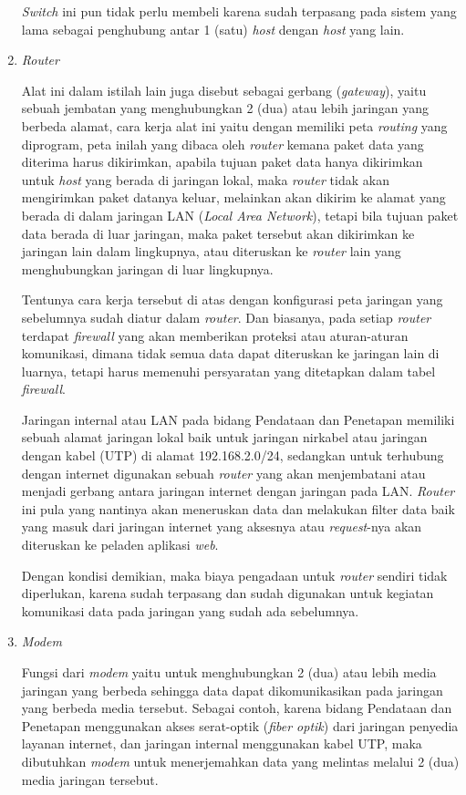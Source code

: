 \documentclass[pdftex,12pt, oneside]{article}
\begin{document}
\begin{enumerate}
\textit{Switch} ini pun tidak perlu membeli karena sudah terpasang pada sistem yang lama sebagai penghubung antar 1 (satu) \textit{host} dengan \textit{host} yang lain.

	\item \textit{Router}

Alat ini dalam istilah lain juga disebut sebagai gerbang (\textit{gateway}), yaitu sebuah jembatan yang menghubungkan 2 (dua) atau lebih jaringan yang berbeda alamat, cara kerja alat ini yaitu dengan memiliki peta \textit{routing} yang diprogram, peta inilah yang dibaca oleh \textit{router} kemana paket data yang diterima harus dikirimkan, apabila tujuan paket data hanya dikirimkan untuk \textit{host} yang berada di jaringan lokal, maka \textit{router} tidak akan mengirimkan paket datanya keluar, melainkan akan dikirim ke alamat yang berada di dalam jaringan LAN (\textit{Local Area Network}), tetapi bila tujuan paket data berada di luar jaringan, maka paket tersebut akan dikirimkan ke jaringan lain dalam lingkupnya, atau diteruskan ke \textit{router} lain yang menghubungkan jaringan di luar lingkupnya.
	
	Tentunya cara kerja tersebut di atas dengan konfigurasi peta jaringan yang sebelumnya sudah diatur dalam \textit{router}. Dan biasanya, pada setiap \textit{router} terdapat \textit{firewall} yang akan memberikan proteksi atau aturan-aturan komunikasi, dimana tidak semua data dapat diteruskan ke jaringan lain di luarnya, tetapi harus memenuhi persyaratan yang ditetapkan dalam tabel \textit{firewall}.
	
	Jaringan internal atau LAN pada bidang Pendataan dan Penetapan memiliki sebuah alamat jaringan lokal baik untuk jaringan nirkabel atau jaringan dengan kabel (UTP) di alamat 192.168.2.0/24, sedangkan untuk terhubung dengan internet digunakan sebuah \textit{router} yang akan menjembatani atau menjadi gerbang antara jaringan internet dengan jaringan pada LAN. \textit{Router} ini pula yang nantinya akan meneruskan data dan melakukan filter data baik yang masuk dari jaringan internet yang aksesnya atau \textit{request}-nya akan diteruskan ke peladen aplikasi \textit{web}.

Dengan kondisi demikian, maka biaya pengadaan untuk \textit{router} sendiri tidak diperlukan, karena sudah terpasang dan sudah digunakan untuk kegiatan komunikasi data pada jaringan yang sudah ada sebelumnya.

	\item \textit{Modem}
	
Fungsi dari \textit{modem} yaitu untuk menghubungkan 2 (dua) atau lebih media jaringan yang berbeda sehingga data dapat dikomunikasikan pada jaringan yang berbeda media tersebut. Sebagai contoh, karena bidang Pendataan dan Penetapan menggunakan akses serat-optik (\textit{fiber optik}) dari jaringan penyedia layanan internet, dan jaringan internal menggunakan kabel UTP, maka dibutuhkan \textit{modem} untuk menerjemahkan data yang melintas melalui 2 (dua) media jaringan tersebut.


\end{enumerate}
\end{document}
